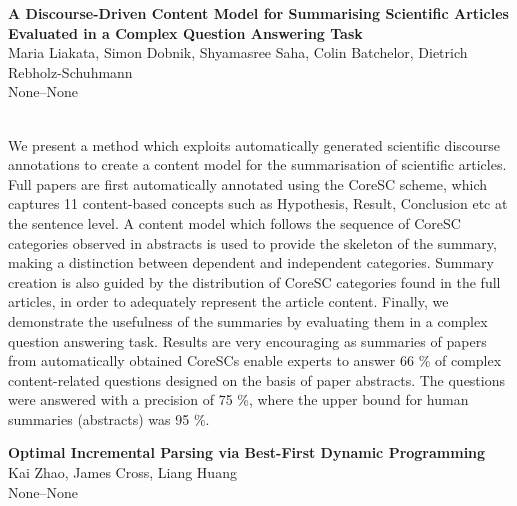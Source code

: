 \documentclass[twoside,makeidx]{book}
\renewcommand{\normalsize}{\fontsize{8}{9}\selectfont}
\renewcommand{\small}{\fontsize{7}{8}\selectfont}
\begin{document}
\par\vspace{2em}\noindent%
\begin{minipage}{\linewidth}%
\begin{center}
\textbf{\normalsize A Discourse-Driven Content Model for Summarising Scientific Articles Evaluated in a Complex Question Answering Task}\\
\normalsize  Maria Liakata,  Simon Dobnik,  Shyamasree Saha,  Colin Batchelor,  Dietrich Rebholz-Schuhmann\\
{\small None--None}\\
\end{center}
\end{minipage}\\[0.5em]
\nopagebreak%
\noindent%
{\small We present a method which exploits automatically generated   scientific discourse annotations to create a content model for the   summarisation of scientific articles. Full papers are first   automatically annotated using the CoreSC scheme, which captures 11   content-based concepts such as Hypothesis, Result, Conclusion etc at   the sentence level. A content model which follows the sequence of   CoreSC categories observed in abstracts is used to provide the   skeleton of the summary, making a distinction between dependent and   independent categories. Summary creation is also guided by the   distribution of CoreSC categories found in the full articles, in   order to adequately represent the article content. Finally, we   demonstrate the usefulness of the summaries by evaluating them in a   complex question answering task. Results are very encouraging as   summaries of papers from automatically obtained CoreSCs enable   experts to answer 66 \% of complex content-related questions designed   on the basis of paper abstracts. The questions were answered with a   precision of 75 \%, where the upper bound for human summaries   (abstracts) was 95 \%.}
\par\vspace{2em}\noindent%
\begin{minipage}{\linewidth}%
\begin{center}
\textbf{\normalsize Optimal Incremental Parsing via Best-First Dynamic Programming}\\
\normalsize  Kai Zhao,  James Cross,  Liang Huang\\
{\small None--None}\\
\end{center}
\end{minipage}\\[0.5em]
\end{document}
